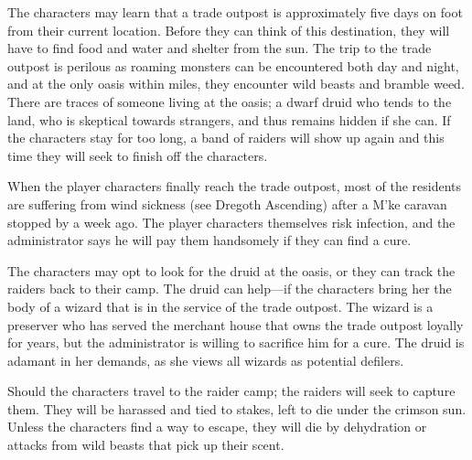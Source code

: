 The characters may learn that a trade outpost is approximately five days on foot from their current location. Before they can think of this destination, they will have to find food and water and shelter from the sun. The trip to the trade outpost is perilous as roaming monsters can be encountered both day and night, and at the only oasis within miles, they encounter wild beasts and bramble weed. There are traces of someone living at the oasis; a dwarf druid who tends to the land, who is skeptical towards strangers, and thus remains hidden if she can. If the characters stay for too long, a band of raiders will show up again and this time they will seek to finish off the characters.

When the player characters finally reach the trade outpost, most of the residents are suffering from wind sickness (see Dregoth Ascending) after a M'ke caravan stopped by a week ago. The player characters themselves risk infection, and the administrator says he will pay them handsomely if they can find a cure.

The characters may opt to look for the druid at the oasis, or they can track the raiders back to their camp. The druid can help---if the characters bring her the body of a wizard that is in the service of the trade outpost. The wizard is a preserver who has served the merchant house that owns the trade outpost loyally for years, but the administrator is willing to sacrifice him for a cure. The druid is adamant in her demands, as she views all wizards as potential defilers.

Should the characters travel to the raider camp; the raiders will seek to capture them. They will be harassed and tied to stakes, left to die under the crimson sun. Unless the characters find a way to escape, they will die by dehydration or attacks from wild beasts that pick up their scent.
